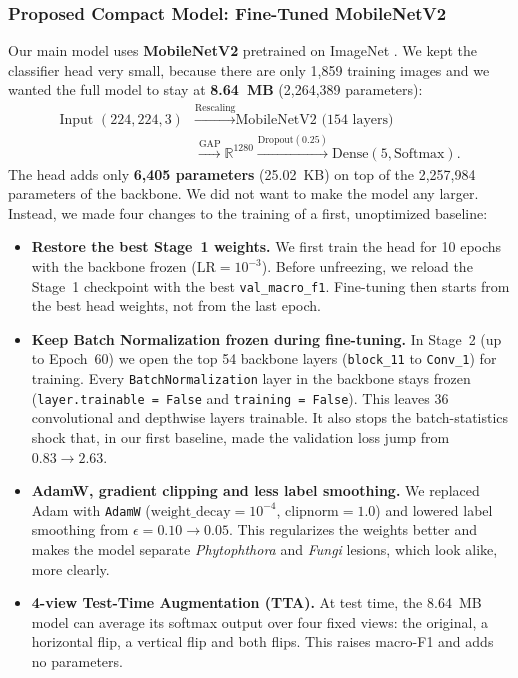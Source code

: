 \subsubsection{Proposed Compact Model: Fine-Tuned MobileNetV2}
Our main model uses \textbf{MobileNetV2} pretrained on ImageNet \cite{sandler2018mobilenetv2}. We kept the classifier head very small, because there are only 1,859 training images and we wanted the full model to stay at \textbf{8.64~MB} (2,264,389 parameters):
\begin{equation}
\begin{aligned}
\text{Input }(224,224,3) &\xrightarrow{\text{Rescaling}} \text{MobileNetV2 (154 layers)} \\
&\xrightarrow{\text{GAP}} \mathbb{R}^{1280} \xrightarrow{\text{Dropout}(0.25)} \text{Dense}(5, \text{Softmax}).
\end{aligned}
\end{equation}
The head adds only \textbf{6,405 parameters} (25.02~KB) on top of the 2,257,984 parameters of the backbone. We did not want to make the model any larger. Instead, we made four changes to the training of a first, unoptimized baseline:
\begin{itemize}
    \item \textbf{Restore the best Stage~1 weights.} We first train the head for 10 epochs with the backbone frozen ($\text{LR} = 10^{-3}$). Before unfreezing, we reload the Stage~1 checkpoint with the best \texttt{val\_macro\_f1}. Fine-tuning then starts from the best head weights, not from the last epoch.
    \item \textbf{Keep Batch Normalization frozen during fine-tuning.} In Stage~2 (up to Epoch~60) we open the top 54 backbone layers (\texttt{block\_11} to \texttt{Conv\_1}) for training. Every \texttt{BatchNormalization} layer in the backbone stays frozen (\texttt{layer.trainable = False} and \texttt{training = False}). This leaves 36 convolutional and depthwise layers trainable. It also stops the batch-statistics shock that, in our first baseline, made the validation loss jump from $0.83 \rightarrow 2.63$.
    \item \textbf{AdamW, gradient clipping and less label smoothing.} We replaced Adam with \texttt{AdamW} ($\text{weight\_decay} = 10^{-4}$, $\text{clipnorm} = 1.0$) \cite{loshchilov2019decoupled} and lowered label smoothing from $\epsilon = 0.10 \rightarrow 0.05$. This regularizes the weights better and makes the model separate \textit{Phytophthora} and \textit{Fungi} lesions, which look alike, more clearly.
    \item \textbf{4-view Test-Time Augmentation (TTA).} At test time, the 8.64~MB model can average its softmax output over four fixed views: the original, a horizontal flip, a vertical flip and both flips. This raises macro-F1 and adds no parameters.
\end{itemize}

